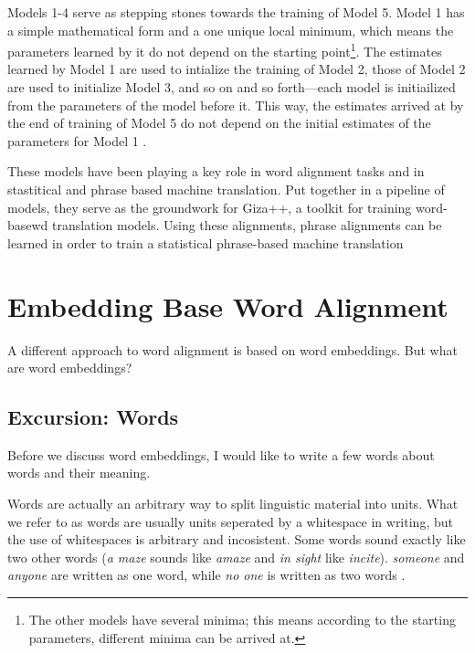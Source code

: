 Models 1-4 serve as stepping stones towards the training of Model 5. 
Model 1 has a simple mathematical form and a one unique local minimum, which means the parameters learned by it do not depend on the starting point\footnote{The other models have several minima; this means according to the starting parameters, different minima can be arrived at.}. 
The estimates learned by Model 1 are used to intialize the training of Model 2, those of Model 2 are used to initialize Model 3, and so on and so forth---each model is initiailized from the parameters of the model before it. 
This way, the estimates arrived at by the end of training of Model 5 do not depend  on the initial estimates of the parameters for Model 1 \autocite{brown-etal-1993-mathematics}. 

These models have been playing a key role in word alignment tasks and in stastitical and phrase based machine translation. 
Put together in a pipeline of models, they serve as the groundwork for Giza++, a toolkit for training word-basewd translation models. 
Using these alignments, phrase alignments can be learned in order to train a statistical phrase-based machine translation \autocites{och-ney-2000-improved,och-ney-2003-smt}




\section{Embedding Base Word Alignment}
A different approach to word alignment is based on word embeddings. 
But what are word embeddings?
 

\subsection{Excursion: Words}
Before we discuss word embeddings, I would like to write a few words about words and their meaning.

Words are actually an arbitrary way to split linguistic material into units. 
What we refer to as words are usually units seperated by a whitespace in writing, but the use of whitespaces is arbitrary and incosistent. 
Some words sound exactly like two other words (\emph{a maze} sounds like \emph{amaze} and \emph{in sight} like \emph{incite}). 
\emph{someone} and \emph{anyone} are written as one word, while \emph{no one} is written as two words \autocite[92-95]{Jespersen1924}.

